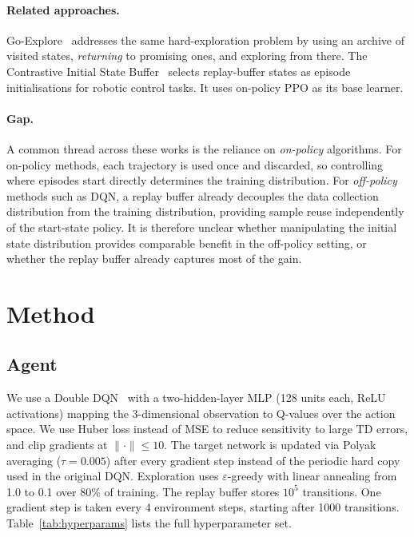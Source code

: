 \documentclass{article}
\begin{document}
\paragraph{Related approaches.}
Go-Explore~\cite{ecoffet2021goexplore} addresses the same hard-exploration problem by using an archive of visited states, \emph{returning} to promising ones, and exploring from there. The Contrastive Initial State Buffer~\cite{messikommer2024cisb} selects replay-buffer states as episode initialisations for robotic control tasks. It uses on-policy PPO as its base learner.

\paragraph{Gap.} A common thread across these works is the reliance on \emph{on-policy} algorithms. For on-policy methods, each trajectory is used once and discarded, so controlling where episodes start directly determines the training distribution. For \emph{off-policy} methods such as DQN, a replay buffer already decouples the data collection distribution from the training distribution, providing sample reuse independently of the start-state policy. It is therefore unclear whether manipulating the initial state distribution provides comparable benefit in the off-policy setting, or whether the replay buffer already captures most of the gain.

\section{Method}
\label{sec:method}

\subsection{Agent}
We use a Double DQN~\cite{van2016double} with a two-hidden-layer
MLP (128 units each, ReLU activations) mapping the 3-dimensional
observation to Q-values over the action space. We use Huber loss instead
of MSE to reduce sensitivity to large TD errors, and clip gradients at
$\lVert\cdot\rVert \le 10$. The target network is updated via Polyak
averaging ($\tau = 0.005$) after every gradient step instead of the
periodic hard copy used in the original DQN. Exploration uses
$\varepsilon$-greedy with linear annealing from 1.0 to 0.1 over 80\% of
training. The replay buffer stores $10^5$ transitions. One gradient step
is taken every 4 environment steps, starting after 1000 transitions.
Table~\ref{tab:hyperparams} lists the full hyperparameter set.
\end{document}
